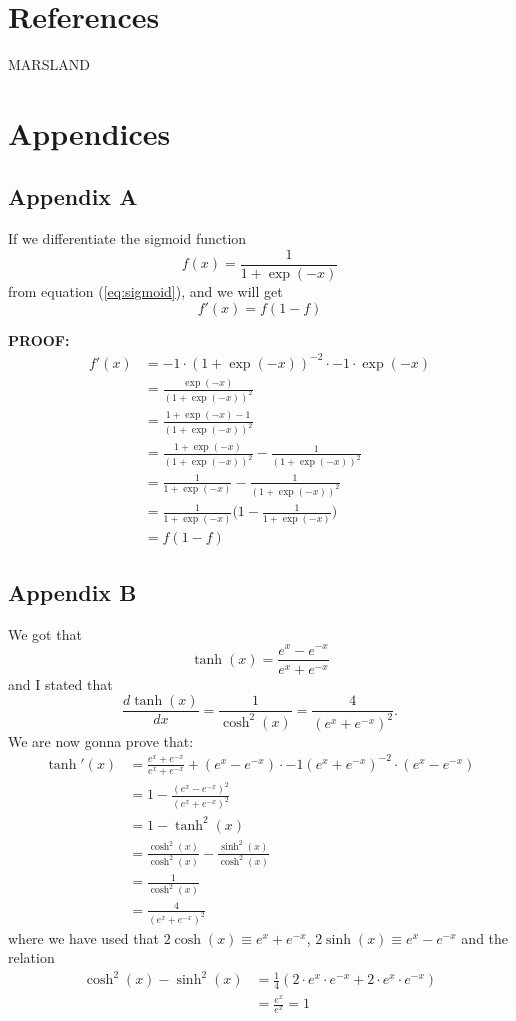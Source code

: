 \documentclass[norsk,a4paper,12pt]{article}
\begin{document}
\section{References}
MARSLAND

\newpage
\section{Appendices}
\subsection{Appendix A}
If we differentiate the sigmoid function 
\begin{equation}
f(x)=\frac{1}{1+\exp(-x)}
\end{equation}
from equation (\ref{eq:sigmoid}), and we will get
\begin{equation}
f'(x)=f(1-f)
\end{equation}

\textbf{PROOF:}
\begin{align*}
f'(x) &= -1\cdot(1+\exp(-x))^{-2}\cdot -1\cdot\exp(-x)\\
&=\frac{\exp(-x)}{(1+\exp(-x))^{2}}\\
&=\frac{1+\exp(-x)-1}{(1+\exp(-x))^{2}}\\
&=\frac{1+\exp(-x)}{(1+\exp(-x))^{2}} - \frac{1}{(1+\exp(-x))^{2}}\\
&=\frac{1}{1+\exp(-x)} - \frac{1}{(1+\exp(-x))^{2}}\\
&=\frac{1}{1+\exp(-x)}\bigg(1 - \frac{1}{1+\exp(-x)}\bigg)\\
&=f(1-f)
\end{align*}

\subsection{Appendix B}
We got that
\begin{equation}
\tanh(x)=\frac{e^x-e^{-x}}{e^x + e^{-x}}
\end{equation}
and I stated that
\begin{equation}
\frac{d\tanh(x)}{dx}=\frac{1}{\cosh^2(x)}=\frac{4}{(e^x+e^{-x})^2}.
\end{equation}
We are now gonna prove that:
\begin{align*}
\tanh'(x)&=\frac{e^x + e^{-x}}{e^x + e^{-x}} + (e^{x} - e^{-x})\cdot-1(e^x + e^{-x})^{-2}\cdot(e^x - e^{-x})\\
&=1-\frac{(e^x - e^{-x})^2}{(e^x + e^{-x})^2}\\
&=1-\tanh^2(x)\\
&=\frac{\cosh^2(x)}{\cosh^2(x)}-\frac{\sinh^2(x)}{\cosh^2(x)}\\
&=\frac{1}{\cosh^2(x)}\\
&=\frac{4}{(e^x+e^{-x})^2}
\end{align*}
where we have used that $2\cosh(x)\equiv e^x + e^{-x}$, $2\sinh(x)\equiv e^x - e^{-x}$ and the relation
\begin{align*}
\cosh^2(x)-\sinh^2(x) &= \frac{1}{4}(2\cdot e^x\cdot e^{-x} + 2\cdot e^x\cdot e^{-x})\\
&=\frac{e^x}{e^x}=1
\end{align*}
\end{document}
